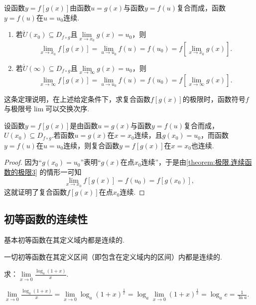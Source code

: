 \begin{theorem}\label{theorem:极限.连续函数的极限3}
\def\D{D_{f \circ g}}
设函数\(y = f[g(x)]\)由函数\(u = g(x)\)与函数\(y = f(u)\)复合而成，函数\(y = f(u)\)在\(u = u_0\)连续.
\begin{enumerate}
\item 若\(\mathring{U}(x_0) \subseteq \D\)且\(\lim\limits_{x \to x_0}g(x) = u_0\)，则\[
\lim\limits_{x \to x_0}f[g(x)]
= \lim\limits_{u \to u_0}f(u) = f(u_0)
= f\left[ \lim\limits_{x \to x_0} g(x) \right].
\]

\item 若\(\mathring{U}(\infty) \subseteq \D\)且\(\lim\limits_{x\to\infty}g(x) = u_0\)，则\[
\lim\limits_{x \to \infty}f[g(x)]
= \lim\limits_{u \to u_0}f(u) = f(u_0)
= f\left[ \lim\limits_{x \to \infty} g(x) \right].
\]
\end{enumerate}
\end{theorem}
这条定理说明，在上述给定条件下，求复合函数\(f[g(x)]\)的极限时，函数符号\(f\)与极限号\(\lim\)可以交换次序.

\begin{theorem}\label{theorem:极限.连续函数的极限4}
设函数\(y = f[g(x)]\)是由函数\(u = g(x)\)与函数\(y = f(u)\)复合而成，\(U(x_0) \subseteq D_{f \circ g}\).若函数\(u = g(x)\)在\(x = x_0\)连续，且\(g(x_0) = u_0\)，而函数\(y = f(u)\)在\(u = u_0\)连续，则复合函数\(y = f[g(x)]\)在\(x = x_0\)也连续.
\begin{proof}
因为“\(g(x_0) = u_0\)”表明“\(g(x)\)在点\(x_0\)连续”，于是由\cref{theorem:极限.连续函数的极限3} 的情形一可知\[
\lim\limits_{x \to x_0}f[g(x)]
= f(u_0) = f[g(x_0)],
\]这就证明了复合函数\(f[g(x)]\)在点\(x_0\)连续.
\end{proof}
\end{theorem}

\subsection{初等函数的连续性}
\begin{theorem}\label{theorem:极限.连续函数的极限5}
基本初等函数在其定义域内都是连续的.
\end{theorem}

\begin{corollary}\label{theorem:极限.连续函数的极限6}
一切初等函数在其定义区间（即包含在定义域内的区间）内都是连续的.
\end{corollary}

\begin{example}
求：\(\lim\limits_{x\to0}\frac{\log_a (1+x)}{x}\).
\begin{solution}
\(
\lim\limits_{x\to0}\frac{\log_a (1+x)}{x}
= \lim\limits_{x\to0}\log_a (1+x)^{\frac{1}{x}}
= \log_a \lim\limits_{x\to0}(1+x)^{\frac{1}{x}}
= \log_a e
= \frac{1}{\ln a}.
\)
\end{solution}
\end{example}

